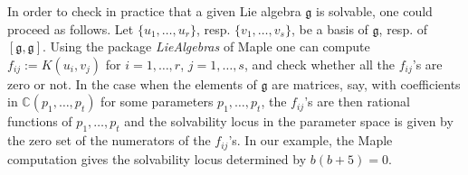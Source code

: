 \documentclass[pdftex]{sigma}
\numberwithin{equation}{section}
\begin{document}
In order to check in practice that a given Lie algebra $\mathfrak{g}$ is solvable, one could proceed as follows.
Let $\{u_1, \dots, u_r\}$, resp. $\{v_1, \dots, v_s\}$, be a basis of $\mathfrak{g}$, resp. of $[\mathfrak{g},\mathfrak{g}]$. Using the package {\it LieAlgebras} of Maple one can compute $f_{ij}:=K(u_i,v_j)$ for $i =1,\dots, r$, $j=1,\dots, s$, and check whether all the $f_{ij}$'s are zero or not. In the case when the elements of $\mathfrak{g}$ are matrices, say, with coefficients in ${\mathbb C}(p_1, \dots, p_t)$ for some parameters $p_1, \dots, p_t$, the $f_{ij}$'s are then rational functions of $p_1, \dots, p_t$ and the solvability locus in the parameter space is given by the zero set of the numerators of the $f_{ij}$'s. In our example, the Maple computation gives the solvability locus determined by $b(b+5)=0$.
\end{document}
